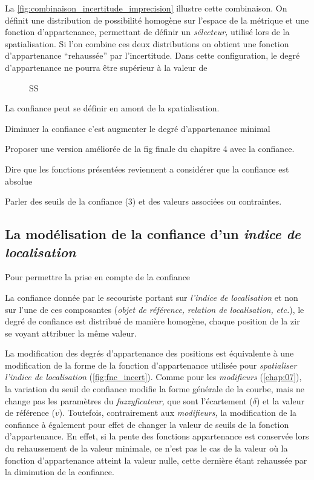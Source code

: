 La \autoref{fig:combinaison_incertitude_imprecision} illustre cette
combinaison. On définit une distribution de possibilité homogène sur
l'espace de la métrique et une fonction d'appartenance, permettant de
définir un \emph{sélecteur,} utilisé lors de la spatialisation. Si
l'on combine ces deux distributions on obtient une fonction
d'appartenance \enquote{rehaussée} par l'incertitude. Dans cette
configuration, le degré d'appartenance ne pourra être supérieur à la
valeur de 

\begin{figure}
  \centering
  
  \caption{SS}
  \label{fig:combinaison_incertitude_imprecision}
\end{figure}


La confiance peut se définir en amont de la spatialisation.

Diminuer la confiance c'est augmenter le degré d'appartenance minimal

Proposer une version améliorée de la fig finale du chapitre 4 avec la
confiance.

Dire que les fonctions présentées reviennent a considérer que la
confiance est absolue

Parler des seuils de la confiance (3) et des valeurs associées ou
contraintes.


\subsection{La modélisation de la confiance d'un \emph{indice de
    localisation}}

Pour permettre la prise en compte de la confiance


La confiance donnée par le secouriste portant sur \emph{l'indice de
  localisation} et non sur l'une de ces composantes (\eg \emph{objet
  de référence,} \emph{relation de localisation,} \emph{etc.}), le
degré de confiance est distribué de manière homogène, chaque position
de la \ac{zir} se voyant attribuer la même valeur.


La modification des degrés d'appartenance des positions est
équivalente à une modification de la forme de la fonction
d'appartenance utilisée pour \emph{spatialiser l'indice de
  localisation} (\autoref{fig:fnc_incert}). Comme pour les
\emph{modifieurs} (\autoref{chap:07}), la variation du seuil de
confiance modifie la forme générale de la courbe, mais ne change pas
les paramètres du \emph{fuzzyficateur,} que sont l'écartement
(\(\delta\)) et la valeur de référence (\(v\)). Toutefois,
contrairement aux \emph{modifieurs,} la modification de la confiance à
également pour effet de changer la valeur de seuils de la fonction
d'appartenance. En effet, si la pente des fonctions appartenance est
conservée lors du rehaussement de la valeur minimale, ce n'est pas le
cas de la valeur où la fonction d'appartenance atteint la valeur
nulle, cette dernière étant rehaussée par la diminution de la
confiance.

